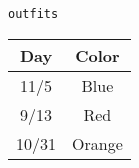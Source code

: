 \begin{center}
\lstinline{outfits}

\begin{tabular}{|c|c|}
 \hline
 \textbf{Day} & \textbf{Color} \\
 \hline
 11/5 & Blue \\
 \hline
 9/13 & Red \\
 \hline
 10/31 & Orange \\
 \hline
\end{tabular}
\end{center}